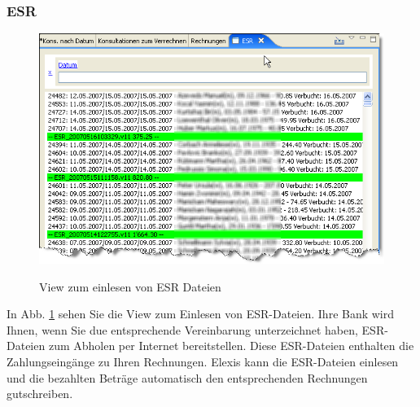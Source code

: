 \subsubsection{ESR} 
\begin{figure}[hb]
  \includegraphics{images/esr1}\\
  \caption{View zum einlesen von ESR Dateien}\label{fig:esr}
\end{figure}

In Abb. \ref{fig:esr} sehen Sie die View zum Einlesen von ESR-Dateien. Ihre Bank wird Ihnen, wenn Sie due entsprechende Vereinbarung unterzeichnet haben, ESR-Dateien zum Abholen per Internet bereitstellen. Diese ESR-Dateien enthalten die Zahlungseingänge zu Ihren Rechnungen. Elexis kann die ESR-Dateien einlesen und die bezahlten Beträge automatisch den entsprechenden Rechnungen gutschreiben.

